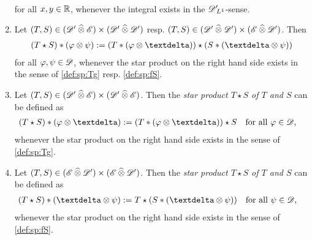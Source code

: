 \begin{definition}
\begin{enumerate}
\begin{align}
            \label{def:sp:fS}
        \end{align}
        for all $ x,y \in \mathbb{ R } $,
        whenever the integral exists in the $\mathscr{  D  }'\hspace{-2pt}{}_{ L^{ 1 } }$-sense.
        \item
        Let $ (T,S) \in (\mathscr{  D  }' \mathbin{\widehat{\otimes}} \mathscr{  E  }) \times (\mathscr{  D  }' \mathbin{\widehat{\otimes}} \mathscr{  D  }') $
        resp.
        $ (T,S) \in (\mathscr{  D  }' \mathbin{\widehat{\otimes}} \mathscr{  D  }') \times (\mathscr{  E  } \mathbin{\widehat{\otimes}} \mathscr{  D  }') $.
        Then
        \begin{align}
            ( T \star S ) * ( \ph \tepro \ps )
            :=
            ( T * ( \ph \tepro \sfdeo ) ) \star ( S * ( \sfdeo \tepro \ps ) )
        \end{align}
        for all $ \varphi,\psi \in \mathscr{  D  } $,
        whenever the star product on the right hand side
        exists in the sense of \eqref{def:sp:Tg} resp. \eqref{def:sp:fS}.
        \item
        Let $ (T,S) \in (\mathscr{  D  }' \mathbin{\widehat{\otimes}} \mathscr{  E  }) \times (\mathscr{  D  }' \mathbin{\widehat{\otimes}} \mathscr{  E  }) $.
        Then the {\em star product $ T \star S $ of $ T $ and $ S $}
        can be defined as
        \begin{align}
            ( T \star S ) * ( \ph \tepro \sfdeo )
            &:=
            ( T * ( \ph \tepro \sfdeo ) ) \star S
            &&\text{for all $ \ph \in \fsTest $,}
        \end{align}
        whenever the star product on the right hand side
        exists in the sense of \eqref{def:sp:Tg}.
        \item
        Let $ (T,S) \in (\mathscr{  E  } \mathbin{\widehat{\otimes}} \mathscr{  D  }') \times (\mathscr{  E  } \mathbin{\widehat{\otimes}} \mathscr{  D  }') $.
        Then the {\em star product $ T \star S $ of $ T $ and $ S $}
        can be defined as
        \begin{align}
            ( T \star S ) * ( \sfdeo \tepro \ps )
            &:=
            T \star ( S * ( \sfdeo \tepro \ps ) )
            &&\text{for all $ \ps \in \fsTest $,}
        \end{align}
        whenever the star product on the right hand side
        exists in the sense of \eqref{def:sp:fS}.
    \end{enumerate}
\end{definition}